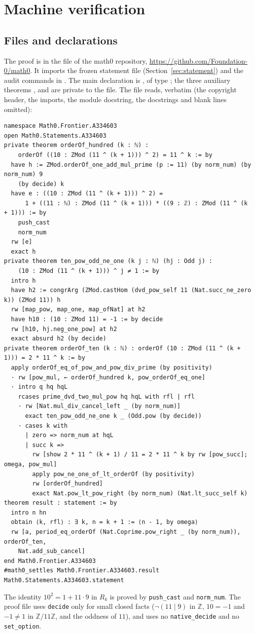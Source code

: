 \documentclass[11pt]{amsart}
\theoremstyle{plain}
\theoremstyle{definition}
\newcommand{\Z}{\mathbb{Z}}
\begin{document}
\section{Machine verification}\label{sec:lean}

\subsection*{Files and declarations}
The proof is in the file  of the math0 repository, \url{https://github.com/Foundation-0/math0}. It imports the frozen statement file  (Section~\ref{sec:statement}) and the audit commands in . The main declaration is , of type ; the three auxiliary theorems ,  and  are private to the file. The file reads, verbatim (the copyright header, the imports, the module docstring, the docstrings and blank lines omitted):
\begin{lstlisting}
namespace Math0.Frontier.A334603
open Math0.Statements.A334603
private theorem orderOf_hundred (k : ℕ) :
    orderOf ((10 : ZMod (11 ^ (k + 1))) ^ 2) = 11 ^ k := by
  have h := ZMod.orderOf_one_add_mul_prime (p := 11) (by norm_num) (by norm_num) 9
    (by decide) k
  have e : ((10 : ZMod (11 ^ (k + 1))) ^ 2) =
      1 + ((11 : ℕ) : ZMod (11 ^ (k + 1))) * ((9 : ℤ) : ZMod (11 ^ (k + 1))) := by
    push_cast
    norm_num
  rw [e]
  exact h
private theorem ten_pow_odd_ne_one (k j : ℕ) (hj : Odd j) :
    (10 : ZMod (11 ^ (k + 1))) ^ j ≠ 1 := by
  intro h
  have h2 := congrArg (ZMod.castHom (dvd_pow_self 11 (Nat.succ_ne_zero k)) (ZMod 11)) h
  rw [map_pow, map_one, map_ofNat] at h2
  have h10 : (10 : ZMod 11) = -1 := by decide
  rw [h10, hj.neg_one_pow] at h2
  exact absurd h2 (by decide)
private theorem orderOf_ten (k : ℕ) : orderOf (10 : ZMod (11 ^ (k + 1))) = 2 * 11 ^ k := by
  apply orderOf_eq_of_pow_and_pow_div_prime (by positivity)
  · rw [pow_mul, ← orderOf_hundred k, pow_orderOf_eq_one]
  · intro q hq hqL
    rcases prime_dvd_two_mul_pow hq hqL with rfl | rfl
    · rw [Nat.mul_div_cancel_left _ (by norm_num)]
      exact ten_pow_odd_ne_one k _ (Odd.pow (by decide))
    · cases k with
      | zero => norm_num at hqL
      | succ k =>
        rw [show 2 * 11 ^ (k + 1) / 11 = 2 * 11 ^ k by rw [pow_succ]; omega, pow_mul]
        apply pow_ne_one_of_lt_orderOf (by positivity)
        rw [orderOf_hundred]
        exact Nat.pow_lt_pow_right (by norm_num) (Nat.lt_succ_self k)
theorem result : statement := by
  intro n hn
  obtain ⟨k, rfl⟩ : ∃ k, n = k + 1 := ⟨n - 1, by omega⟩
  rw [a, period_eq_orderOf (Nat.Coprime.pow_right _ (by norm_num)), orderOf_ten,
    Nat.add_sub_cancel]
end Math0.Frontier.A334603
#math0_settles Math0.Frontier.A334603.result Math0.Statements.A334603.statement
\end{lstlisting}
The identity $10^2=1+11\cdot 9$ in $R_k$ is proved by \texttt{push\_cast} and \texttt{norm\_num}. The proof file uses \texttt{decide} only for small closed facts ($\neg(11\mid9)$ in $\Z$, $10=-1$ and $-1\ne1$ in $\Z/11\Z$, and the oddness of $11$), and uses no \texttt{native\_decide} and no \texttt{set\_option}.
\end{document}
